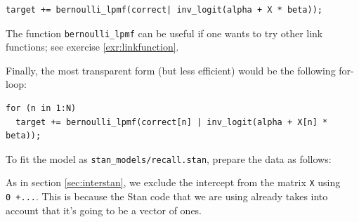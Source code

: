 \documentclass[12pt,]{krantz}
\newenvironment{Shaded}{\begin{snugshade}}{\end{snugshade}}
\newcommand{\KeywordTok}[1]{\textcolor[rgb]{0.13,0.29,0.53}{\textbf{#1}}}
\newcommand{\DataTypeTok}[1]{\textcolor[rgb]{0.13,0.29,0.53}{#1}}
\newcommand{\DecValTok}[1]{\textcolor[rgb]{0.00,0.00,0.81}{#1}}
\newcommand{\StringTok}[1]{\textcolor[rgb]{0.31,0.60,0.02}{#1}}
\newcommand{\OperatorTok}[1]{\textcolor[rgb]{0.81,0.36,0.00}{\textbf{#1}}}
\newcommand{\NormalTok}[1]{#1}
\theoremstyle{definition}
\theoremstyle{definition}
\theoremstyle{definition}
\theoremstyle{remark}
\begin{document}
\begin{verbatim}
target += bernoulli_lpmf(correct| inv_logit(alpha + X * beta));
\end{verbatim}

The function \texttt{bernoulli\_lpmf} can be useful if one wants to try
other link functions; see exercise \ref{exr:linkfunction}.

Finally, the most transparent form (but less efficient) would be the
following for-loop:

\begin{verbatim}
for (n in 1:N)
  target += bernoulli_lpmf(correct[n] | inv_logit(alpha + X[n] * beta));
\end{verbatim}

To fit the model as \texttt{stan\_models/recall.stan}, prepare the data
as follows:

\begin{Shaded}
\end{Shaded}

As in section \ref{sec:interstan}, we exclude the intercept from the
matrix \texttt{X} using \texttt{0\ +...}. This is because the Stan code
that we are using already takes into account that it's going to be a
vector of ones.
\end{document}
